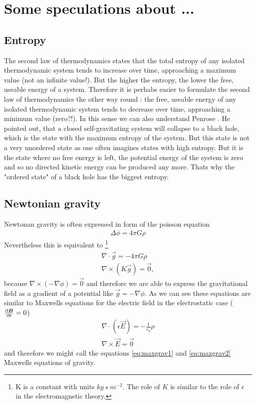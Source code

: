 \section{Some speculations about ...}
\subsection{Entropy}\label{entro}
The second law of thermodynamics states that the total entropy of any isolated
thermodynamic system tends to increase over time, approaching a maximum value
(not an infinite value!). But the higher the entropy, the lower the free,
useable energy of a system. Therefore it is perhabs easier to formulate the
second law of thermodynamics the other way round \citep{Feynman1967}: the free,
useable energy of any isolated thermodynamic system tends to decrease over time,
approaching a minimum value (zero?!). In this sense we can also understand 
Penrose \citep{Penrose1989}. He pointed out, that a closed self-gravitating
system will collapse to a black hole, which is the state with the maximum
entropy of the system. But this state is not a very unordered state
as one often imagines states with high entropy. But it is the state where no
free energy is left, the potential energy of the system is zero and so no
directed kinetic energy can be produced any more. Thats why the "ordered state"
of a black hole has the biggest entropy.

\subsection{Newtonian gravity}
Newtonan gravity is often expressed in form of the poisson equation
\begin{align}
\Delta \phi = 4\pi G\rho
\end{align}
Nevertheless this is equivalent to
\footnote{K is a constant with units $\unit{kg\ s\ m^{-2}}$. The role of
$K$ is similar to the role of $\epsilon$ in the electromagnetic theory.}
\begin{align}
\nabla \cdot \vec{g} = - 4\pi G\rho \label{eq:maxgrav1} \\
\nabla \times (K\vec{g}) = \vec{0},\label{eq:maxgrav2}
\end{align}
because $\nabla \times (-\nabla \phi) = \vec{0}$ and therefore we are able to
express the gravitational field as a gradient of a potential like
$\vec{g}=-\nabla \phi$. As we can see these equations are similar to Maxwells
equations for the electric field in the electrostatic case
($\ppd{t}{\vec{B}}=0$)
\begin{align}
\nabla \cdot (\epsilon \vec{E}) = - \frac{1}{\epsilon_0} \rho \\
\nabla \times \vec{E} = \vec{0}
\end{align}
and therefore we might call the equations \eqref{eq:maxgrav1} and
\eqref{eq:maxgrav2} Maxwells equations of gravity.

